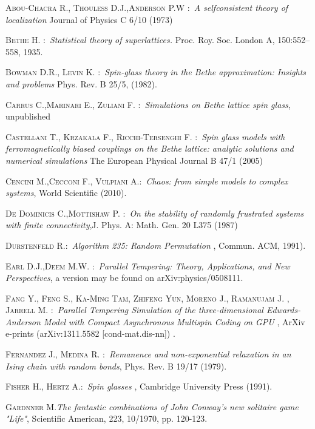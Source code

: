  \textsc{Abou-Chacra R., Thouless D.J.,Anderson P.W} :\ \textit{A selfconsistent theory of localization} Journal of Physics C 6/10 (1973)

 \textsc{Bethe H.} :\ \textit{Statistical theory of superlattices.} Proc. Roy. Soc. London A, 150:552–558, 1935.

 \textsc{Bowman D.R., Levin K.} :\ \textit{Spin-glass theory in the Bethe approximation: Insights and problems} Phys. Rev. B 25/5,  (1982).

 \textsc{Carrus C.,Marinari E., Zuliani F.} :\ \textit{Simulations on Bethe lattice spin glass}, unpublished

 \textsc{Castellani T., Krzakala F., Ricchi-Tersenghi F.} :\ \textit{Spin glass models with ferromagnetically biased couplings on the Bethe lattice: analytic solutions and numerical simulations} The European Physical Journal B 47/1 (2005)

\textsc{Cencini M.,Cecconi F., Vulpiani A.}:\ \textit{Chaos: from simple models to complex systems}, World Scientific (2010).

 \textsc{De Dominicis C.,Mottishaw P.} :\ \textit{On the stability of randomly frustrated systems with finite connectivity},J. Phys. A: Math. Gen. 20 L375 (1987)

 \textsc{Durstenfeld R.}:\ \textit{Algorithm 235: Random Permutation }, Commun. ACM, 1991).

 \textsc{Earl D.J.,Deem M.W.} :\ \textit{Parallel Tempering: Theory, Applications, and New Perspectives}, a version may be found on arXiv:physics/0508111.

 \textsc{Fang Y., Feng S., Ka-Ming Tam, Zhifeng Yun, Moreno J., Ramanujam J. , Jarrell M.} :\ \textit{Parallel Tempering Simulation of the three-dimensional Edwards-Anderson Model with Compact Asynchronous Multispin Coding on GPU
}, ArXiv e-prints (arXiv:1311.5582 [cond-mat.dis-nn]) .

\textsc{Fernandez J., Medina R.} :\ \textit{Remanence and non-exponential relaxation in an Ising chain with random bonds}, Phys. Rev. B 19/17  (1979).

 \textsc{Fisher H., Hertz A.}:\ \textit{Spin glasses }, Cambridge University Press (1991).

\textsc{Gardnner M.}\textit{The fantastic combinations of John Conway's new solitaire game "Life"}, Scientific American, 223, 10/1970, pp. 120-123.

